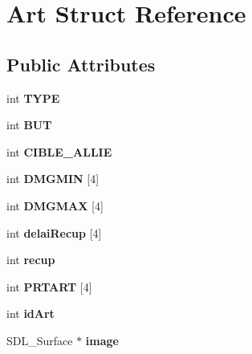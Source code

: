 \hypertarget{structArt}{}\section{Art Struct Reference}
\label{structArt}
\subsection*{Public Attributes}
\begin{DoxyCompactItemize}
\item 
\mbox{\label{structArt_a1ae893e3a31dfe6af97eeed6cba97367}} 
int {\bfseries T\+Y\+PE}
\item 
\mbox{\label{structArt_a064a26901a1b1071222a19516fc2f7e0}} 
int {\bfseries B\+UT}
\item 
\mbox{\label{structArt_acac6eb2dfb490800c537f871f95eeb95}} 
int {\bfseries C\+I\+B\+L\+E\+\_\+\+A\+L\+L\+IE}
\item 
\mbox{\label{structArt_ad6b57c363a5fba35940b56cb781c81bd}} 
int {\bfseries D\+M\+G\+M\+IN} \mbox{[}4\mbox{]}
\item 
\mbox{\label{structArt_af71b0addf97215e14cb116acbca10578}} 
int {\bfseries D\+M\+G\+M\+AX} \mbox{[}4\mbox{]}
\item 
\mbox{\label{structArt_adca884485226bca8296816aaa49c6f8f}} 
int {\bfseries delai\+Recup} \mbox{[}4\mbox{]}
\item 
\mbox{\label{structArt_ae346450ae6949829593ec45dd414084f}} 
int {\bfseries recup}
\item 
\mbox{\label{structArt_a668ccb6cf589b12e1aa2637511439e5c}} 
int {\bfseries P\+R\+T\+A\+RT} \mbox{[}4\mbox{]}
\item 
\mbox{\label{structArt_a6e073de389151bf7bcfaef3fffe08016}} 
int {\bfseries id\+Art}
\item 
\mbox{\label{structArt_a49fd6e4c57b615b53f416ce6a8c04ab9}} 
S\+D\+L\+\_\+\+Surface $\ast$ {\bfseries image}
\item 
\mbox{\label{structArt_ac7a93008cd5cf33f28899a23f592dc0a}} 

\end{DoxyCompactItemize}

